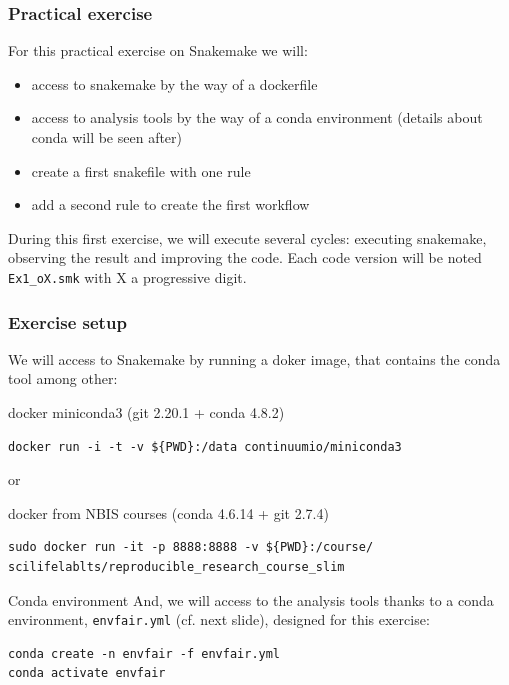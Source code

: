 \begin{frame}[containsverbatim]
\frametitle{Practical exercise}
\begin{exampleblock}{}
For this practical exercise on Snakemake we will:
\begin{itemize}
    \item access to snakemake by the way of \alert{a dockerfile}
    \item access to analysis tools by the way of a \alert{conda environment} (details about conda will be seen after)
    \item create a first snakefile with one rule
    \item add a second rule to create the first workflow
\end{itemize}
During this first exercise, we will execute several cycles: executing snakemake, observing the result and improving the code. Each code version will be noted \verb|Ex1_oX.smk| with X a progressive digit.
\end{exampleblock}
\end{frame}
\begin{frame}[containsverbatim]
\frametitle{Exercise setup}
We will access to Snakemake by running a doker image, that contains the conda tool among other:
\begin{exampleblock}{docker miniconda3 (git 2.20.1 + conda 4.8.2)}
\begin{lstlisting}
docker run -i -t -v ${PWD}:/data continuumio/miniconda3
\end{lstlisting}
\end{exampleblock}
\alert{or }
\begin{exampleblock}{docker from NBIS courses (conda 4.6.14 + git 2.7.4)}
\begin{lstlisting}
sudo docker run -it -p 8888:8888 -v ${PWD}:/course/ scilifelablts/reproducible_research_course_slim
\end{lstlisting}
\end{exampleblock}
\begin{exampleblock}{Conda environment}
And, we will access to the analysis tools thanks to a conda environment, \verb|envfair.yml| (cf. next slide), designed for this exercise:
\begin{lstlisting}
conda create -n envfair -f envfair.yml
conda activate envfair
\end{lstlisting}
\end{exampleblock}
\end{frame}

